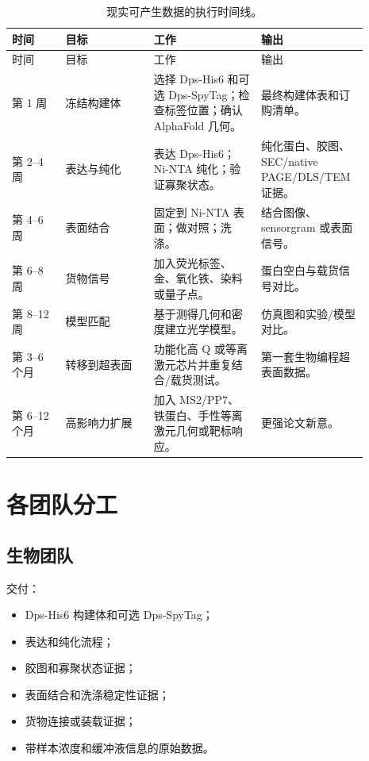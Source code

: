 \documentclass[11pt]{ctexart}
\newcommand{\af}{AlphaFold}
\begin{document}
\begin{longtable}{p{0.14\linewidth}p{0.23\linewidth}p{0.29\linewidth}p{0.23\linewidth}}
\caption{现实可产生数据的执行时间线。}\\
\toprule
时间 & 目标 & 工作 & 输出 \\
\midrule
\endfirsthead
\toprule
时间 & 目标 & 工作 & 输出 \\
\midrule
\endhead
第 1 周 & 冻结构建体 & 选择 Dps-His6 和可选 Dps-SpyTag；检查标签位置；确认 \af{} 几何。 & 最终构建体表和订购清单。 \\
第 2--4 周 & 表达与纯化 & 表达 Dps-His6；Ni-NTA 纯化；验证寡聚状态。 & 纯化蛋白、胶图、SEC/native PAGE/DLS/TEM 证据。 \\
第 4--6 周 & 表面结合 & 固定到 Ni-NTA 表面；做对照；洗涤。 & 结合图像、sensorgram 或表面信号。 \\
第 6--8 周 & 货物信号 & 加入荧光标签、金、氧化铁、染料或量子点。 & 蛋白空白与载货信号对比。 \\
第 8--12 周 & 模型匹配 & 基于测得几何和密度建立光学模型。 & 仿真图和实验/模型对比。 \\
第 3--6 个月 & 转移到超表面 & 功能化高 Q 或等离激元芯片并重复结合/载货测试。 & 第一套生物编程超表面数据。 \\
第 6--12 个月 & 高影响力扩展 & 加入 MS2/PP7、铁蛋白、手性等离激元几何或靶标响应。 & 更强论文新意。 \\
\bottomrule
\end{longtable}

\section{各团队分工}

\subsection{生物团队}

交付：

\begin{itemize}
\item Dps-His6 构建体和可选 Dps-SpyTag；
\item 表达和纯化流程；
\item 胶图和寡聚状态证据；
\item 表面结合和洗涤稳定性证据；
\item 货物连接或装载证据；
\item 带样本浓度和缓冲液信息的原始数据。
\end{itemize}
\end{document}
